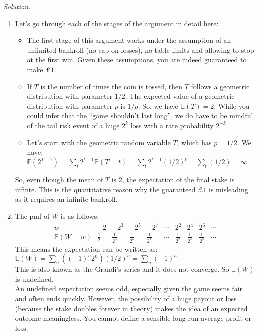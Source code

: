 \documentclass[11pt]{article}
\newenvironment{solution}{%
  \noindent\textit{Solution.}\quad
}{\par\bigskip}
\begin{document}
\begin{solution}
\begin{enumerate}
      \item Let's go through each of the stages of the argument in detail here: 
            \begin{itemize}
                  \item The first stage of this argument works under the assumption of an unlimited 
                        bankroll (no cap on losses), no table limits  and allowing to stop at the 
                        first win. Given these assumptions, you are indeed guaranteed to make $\pounds 1$.
                  \item If $T$ is the number of times the coin is tossed, then $T$ follows a geometric 
                        distribution with parameter 1/2. The expected value of a geometric distribution 
                        with parameter $p$ is $1/p$. So, we have $\mathbb{E}(T)=2$. While you could infer 
                        that the ``game shouldn't last long'', we do have to be mindful of the tail risk 
                        event of a huge $2^k$ loss with a rare probability $2^{-k}$. 
                  \item Let's start with the geometric random variable $T$, which has $p=1/2$. We have: \\
                        $\mathbb{E}(2^{T-1})=\sum_t 2^{t-1} \mathbb{P}(T=t)=\sum_t 2^{t-1}(1/2)^{t}=\sum_t (1/2)= \infty $ 
            \end{itemize}
            So, even though the mean of $T$ is 2, the expectation of the final stake is infinte. This is the 
            quantitative reason why the guaranteed $\pounds 1$ is misleading as it requires an infinite bankroll.
      \item The pmf of $W$ is as follows:
            \[
            \begin{array}{c|ccccccccc}
                  w & -2 & -2^{3} & -2^{5} & -2^{7} & \cdots & 2^{2} & 2^{4} & 2^{6} & \cdots \\ \hline
                  \mathbb{P}(W=w) & \tfrac12 & \tfrac{1}{2^{3}} & \tfrac{1}{2^{5}} & \tfrac{1}{2^{7}} & \cdots
                  & \tfrac{1}{2^{2}} & \tfrac{1}{2^{4}} & \tfrac{1}{2^{6}} & \cdots
            \end{array}
            \]
            This means the expectation can be written as: \\
            $\mathbb{E}(W) = \sum_n ((-1)^{n}2^{n})(1/2)^{n} = \sum_n (-1)^{n}$ \\
            This is also known as the Grandi's series and it does not converge. So $\mathbb{E}(W)$ is undefined. \\
            An undefined expectation seems odd, especially given the game seems fair and often ends quickly. 
            However, the possibility of a huge payout or loss (because the stake doubles forever in theory) 
            makes the idea of an expected outcome meaningless. You cannot define a sensible long-run average 
            profit or loss. 
\end{enumerate}
\end{solution}
\end{document}
